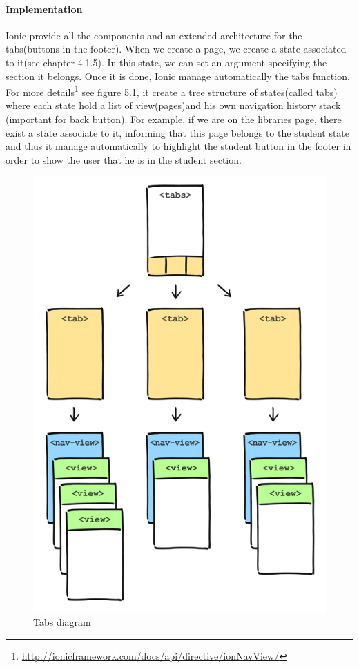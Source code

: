 \documentclass[11pt, a4paper]{report}
\begin{document}
\paragraph{Implementation}
Ionic provide all the components and an extended architecture for the tabs(buttons in the footer). When we create a page, we create a state associated to it(see chapter 4.1.5). In this state, we can set an argument specifying the section it belongs. Once it is done, Ionic manage automatically the tabs function. For more details\footnote{\url{http://ionicframework.com/docs/api/directive/ionNavView/}} see figure 5.1, it create a tree structure of states(called tabs) where each state hold a list of view(pages)and his own navigation history stack (important for back button). For example, if we are on the libraries page, there exist a state associate to it, informing that this page belongs to the student state and thus it manage automatically to highlight the student button in the footer in order to show the user that he is in the student section.
\begin{figure}
\centering
\includegraphics[scale = 0.3]{Images/tabs-nav-stack.png}
\caption{Tabs diagram}
\end{figure}
\end{document}
